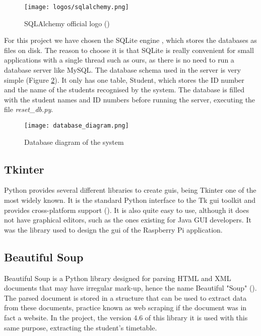 	\begin{figure}[!ht]
		\centering
		\texttt{[image: logos/sqlalchemy.png]}
		\caption{SQLAlchemy official logo (\cite{sqlalchemy_main_website})}
		\label{fig:sqlalchemy}
	\end{figure}

	For this project we have chosen the SQLite engine , which stores the databases as files on disk. The reason to choose it is that SQLite is really convenient for small applications with a single thread such as ours, as there is no need to run a database server like MySQL. The database schema used in the server is very simple (Figure \ref{fig:database_diagram}). It only has one table, Student, which stores the ID number and the name of the students recognised by the system. The database is filled with the student names and ID numbers before running the server, executing the file \textit{reset{\_}db.py}.

	\begin{figure}[!ht]
		\centering
		\texttt{[image: database\_diagram.png]}
		\caption{Database diagram of the system}
		\label{fig:database_diagram}
	\end{figure}

	\subsection{Tkinter} 
	Python provides several different libraries to create \glspl{gui}, being Tkinter one of the most widely known. It is the standard Python interface to the Tk \gls{gui} toolkit and provides cross-platform support (\cite{tkinter_docs}). It is also quite easy to use, although it does not have graphical editors, such as the ones existing for Java GUI developers. It was the library used to design the \gls{gui} of the Raspberry Pi application.  

	\subsection{Beautiful Soup}
	Beautiful Soup is a Python library designed for parsing HTML and XML documents that may have irregular mark-up, hence the name Beautiful "Soup" (\cite{beautiful_soup_main}). The parsed document is stored in a structure that can be used to extract data from these documents, practice known as web scraping if the document was in fact a website. In the project, the version 4.6 of this library it is used with this same purpose, extracting the student's timetable. 	

